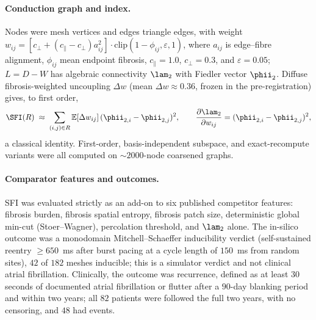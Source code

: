 \paragraph{Conduction graph and index.} Nodes were mesh vertices and edges
triangle edges, with weight
$w_{ij}=[c_\perp+(c_\parallel-c_\perp)a_{ij}^{2}]\cdot\mathrm{clip}(1-\phi_{ij},\varepsilon,1)$,
where $a_{ij}$ is edge--fibre alignment, $\phi_{ij}$ mean endpoint fibrosis,
$c_\parallel=1.0$, $c_\perp=0.3$, and $\varepsilon=0.05$; $L=D-W$ has algebraic
connectivity $\lam_2$ with Fiedler vector $\phii_2$. Diffuse fibrosis-weighted
uncoupling $\Delta w$ (mean $\Delta w\approx0.36$, frozen in the pre-registration)
gives, to first order,
\begin{equation}
\SFI(R)\;\approx\;\sum_{(i,j)\in R}\mathbb{E}[\Delta w_{ij}]\,
(\phii_{2,i}-\phii_{2,j})^{2},
\qquad
\frac{\partial\lam_2}{\partial w_{ij}}=(\phii_{2,i}-\phii_{2,j})^{2},
\end{equation}
a classical identity. First-order, basis-independent subspace, and
exact-recompute variants were all computed on $\sim\!2000$-node coarsened graphs.

\paragraph{Comparator features and outcomes.} SFI was evaluated strictly as an
add-on to six published competitor features: fibrosis burden,
fibrosis spatial entropy, fibrosis patch size, deterministic global min-cut
(Stoer--Wagner), percolation threshold, and $\lam_2$ alone. The in-silico outcome
was a monodomain Mitchell--Schaeffer inducibility verdict (self-sustained reentry
$\geq650$~ms after burst pacing at a cycle length of $150$~ms from random sites),
$42$ of $182$ meshes inducible; this is a simulator verdict and not clinical
atrial fibrillation. Clinically, the outcome was recurrence, defined as at least
$30$ seconds of documented atrial fibrillation or flutter after a $90$-day
blanking period and within two years; all $82$ patients were followed the full
two years, with no censoring, and $48$ had events.

